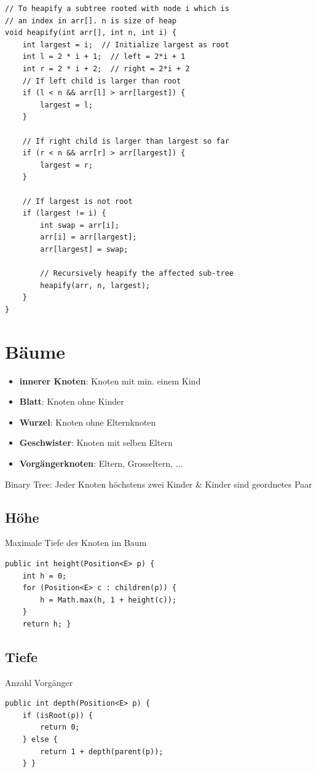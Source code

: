 \begin{multicols*}{4}
\begin{lstlisting}
// To heapify a subtree rooted with node i which is 
// an index in arr[]. n is size of heap 
void heapify(int arr[], int n, int i) { 
	int largest = i;  // Initialize largest as root 
	int l = 2 * i + 1;  // left = 2*i + 1 
	int r = 2 * i + 2;  // right = 2*i + 2 
	// If left child is larger than root 
	if (l < n && arr[l] > arr[largest]) {
		largest = l; 
	}
	
	// If right child is larger than largest so far 
	if (r < n && arr[r] > arr[largest]) {
		largest = r; 
	}
	
	// If largest is not root 
	if (largest != i) { 
		int swap = arr[i]; 
		arr[i] = arr[largest]; 
		arr[largest] = swap; 
		
		// Recursively heapify the affected sub-tree 
		heapify(arr, n, largest); 
	} 
} 
			\end{lstlisting}

		
		
\section{Bäume}
	\begin{itemize}
		\item \textbf{innerer Knoten}: Knoten mit min. einem Kind
		\item \textbf{Blatt}: Knoten ohne Kinder
		\item \textbf{Wurzel}: Knoten ohne Elternknoten
		\item \textbf{Geschwister}: Knoten mit selben Eltern
		\item \textbf{Vorgängerknoten}: Eltern, Grosseltern, ...
	\end{itemize}

	Binary Tree: Jeder Knoten höchstens zwei Kinder \& Kinder sind geordnetes Paar

	\subsection{Höhe}
	Maximale Tiefe der Knoten im Baum
		\begin{lstlisting}
public int height(Position<E> p) {
	int h = 0;
	for (Position<E> c : children(p)) {
		h = Math.max(h, 1 + height(c));
	}
	return h; }
		\end{lstlisting}
	
	\subsection{Tiefe}
	Anzahl Vorgänger
		\begin{lstlisting}
public int depth(Position<E> p) {
	if (isRoot(p)) {
		return 0;
	} else {
		return 1 + depth(parent(p));
	} }
		\end{lstlisting}

\end{multicols*}
